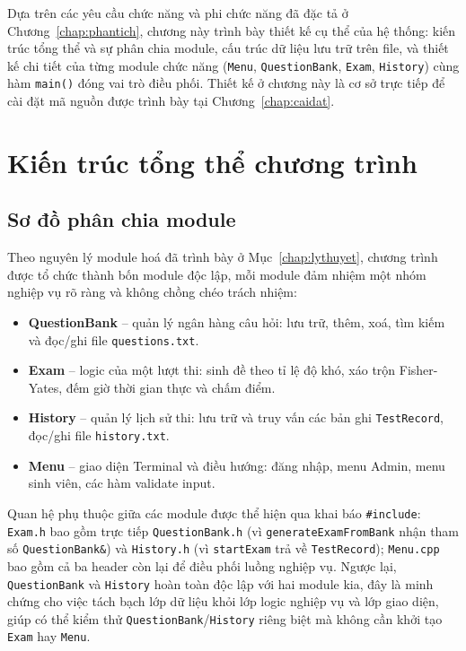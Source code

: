\documentclass[11pt]{report}
\begin{document}
Dựa trên các yêu cầu chức năng và phi chức năng đã đặc tả ở Chương~\ref{chap:phantich}, chương này trình bày thiết kế cụ thể của hệ thống: kiến trúc tổng thể và sự phân chia module, cấu trúc dữ liệu lưu trữ trên file, và thiết kế chi tiết của từng module chức năng (\texttt{Menu}, \texttt{QuestionBank}, \texttt{Exam}, \texttt{History}) cùng hàm \texttt{main()} đóng vai trò điều phối. Thiết kế ở chương này là cơ sở trực tiếp để cài đặt mã nguồn được trình bày tại Chương~\ref{chap:caidat}.

\section{Kiến trúc tổng thể chương trình}

\subsection{Sơ đồ phân chia module}

Theo nguyên lý module hoá đã trình bày ở Mục~\ref{chap:lythuyet}, chương trình được tổ chức thành bốn module độc lập, mỗi module đảm nhiệm một nhóm nghiệp vụ rõ ràng và không chồng chéo trách nhiệm:

\begin{itemize}[leftmargin=*]
    \item \textbf{QuestionBank} -- quản lý ngân hàng câu hỏi: lưu trữ, thêm, xoá, tìm kiếm và đọc/ghi file \texttt{questions.txt}.
    \item \textbf{Exam} -- logic của một lượt thi: sinh đề theo tỉ lệ độ khó, xáo trộn Fisher-Yates, đếm giờ thời gian thực và chấm điểm.
    \item \textbf{History} -- quản lý lịch sử thi: lưu trữ và truy vấn các bản ghi \texttt{TestRecord}, đọc/ghi file \texttt{history.txt}.
    \item \textbf{Menu} -- giao diện Terminal và điều hướng: đăng nhập, menu Admin, menu sinh viên, các hàm validate input.
\end{itemize}

Quan hệ phụ thuộc giữa các module được thể hiện qua khai báo \texttt{\#include}: \texttt{Exam.h} bao gồm trực tiếp \texttt{QuestionBank.h} (vì \texttt{generateExamFromBank} nhận tham số \texttt{QuestionBank\&}) và \texttt{History.h} (vì \texttt{startExam} trả về \texttt{TestRecord}); \texttt{Menu.cpp} bao gồm cả ba header còn lại để điều phối luồng nghiệp vụ. Ngược lại, \texttt{QuestionBank} và \texttt{History} hoàn toàn độc lập với hai module kia, đây là minh chứng cho việc tách bạch lớp dữ liệu khỏi lớp logic nghiệp vụ và lớp giao diện, giúp có thể kiểm thử \texttt{QuestionBank}/\texttt{History} riêng biệt mà không cần khởi tạo \texttt{Exam} hay \texttt{Menu}.
\end{document}
